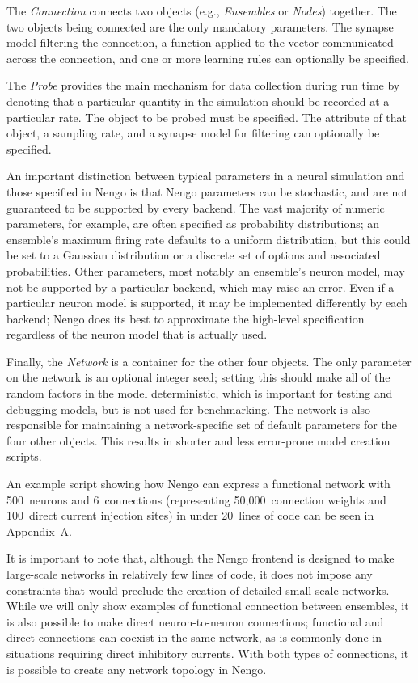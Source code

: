 \documentclass{frontiersSCNS}
\begin{document}
The \textit{Connection} connects two objects
(e.g., \textit{Ensembles} or \textit{Nodes}) together.
The two objects being connected are the only mandatory parameters.
The synapse model filtering the connection,
a function applied to the vector
communicated across the connection,
and one or more learning rules
can optionally be specified.

The \textit{Probe} provides the main mechanism
for data collection during run time
by denoting that a particular
quantity in the simulation should be recorded
at a particular rate.
The object to be probed must be specified.
The attribute of that object,
a sampling rate, and a synapse model for filtering
can optionally be specified.

An important distinction between typical
parameters in a neural simulation
and those specified in Nengo
is that Nengo parameters can be stochastic,
and are not guaranteed
to be supported by every backend.
The vast majority of numeric parameters,
for example,
are often specified as probability distributions;
an ensemble's maximum firing rate defaults to
a uniform distribution,
but this could be set to a Gaussian distribution
or a discrete set of options and associated
probabilities.
Other parameters,
most notably an ensemble's neuron model,
may not be supported by a particular backend,
which may raise an error.
Even if a particular neuron model is supported,
it may be implemented differently by each backend;
Nengo does its best to approximate
the high-level specification regardless of
the neuron model that is actually used.

Finally, the \textit{Network} is a
container for the other four objects.
The only parameter on the network
is an optional integer seed;
setting this should make
all of the random factors
in the model deterministic,
which is important for testing
and debugging models,
but is not used for benchmarking.
The network is also responsible for maintaining
a network-specific set of default parameters
for the four other objects.
This results in shorter and less error-prone
model creation scripts.

An example script showing how Nengo can
express a functional network
with 500~neurons and 6~connections
(representing 50,000~connection weights
and 100~direct current injection sites)
in under 20~lines of code
can be seen in Appendix~A.

It is important to note that,
although the Nengo frontend
is designed to make large-scale networks
in relatively few lines of code,
it does not impose any constraints
that would preclude
the creation
of detailed small-scale networks.
While we will only show examples
of functional connection between ensembles,
it is also possible
to make direct neuron-to-neuron connections;
functional and direct connections
can coexist in the same network,
as is commonly done in situations
requiring direct inhibitory currents.
With both types of connections,
it is possible to create
any network topology in Nengo.
\end{document}
